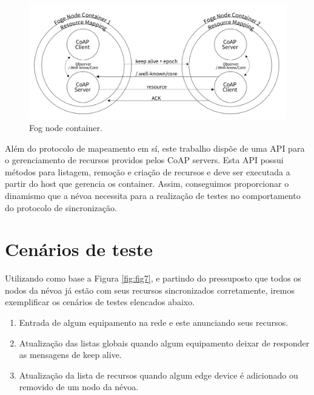 \begin{figure}[H]
    \centering\includegraphics[width=.8\textwidth]{fig13.png}
    \caption%
    {\label{fig:fig13} Fog node container.}
\end{figure}


Além do protocolo de mapeamento em sí, este trabalho dispõe de uma API para o gerenciamento de recursos providos pelos CoAP servers.
Esta API possui métodos para listagem, remoção e criação de recursos e deve ser executada a partir do host que gerencia os container.
Assim, conseguimos proporcionar o dinamismo que a névoa necessita para a realização de testes no comportamento do protocolo de sincronização.



\section{Cenários de teste}


Utilizando como base a Figura \ref{fig:fig7}, e partindo do pressuposto que todos os nodos da névoa já estão com seus recursos sincronizados corretamente,
iremos exemplificar os cenários de testes elencados abaixo.

\begin{enumerate}
    \item Entrada de algum equipamento na rede e este anunciando seus recursos. 
    \item Atualização das listas globais quando algum equipamento deixar de responder as mensagens de keep alive.
    \item Atualização da lista de recursos quando algum edge device é adicionado ou removido de um nodo da névoa.
\end{enumerate}

